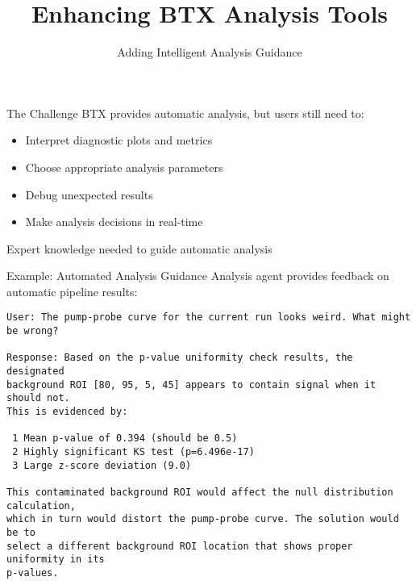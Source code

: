 \documentclass{beamer}
\title{Enhancing BTX Analysis Tools}
\subtitle{Adding Intelligent Analysis Guidance}
\author{}
\date{}
\begin{document}
\begin{frame}
    \titlepage
\end{frame}

\begin{frame}{The Challenge}
    BTX provides automatic analysis, but users still need to:
    \begin{itemize}
        \item Interpret diagnostic plots and metrics
        \item Choose appropriate analysis parameters
        \item Debug unexpected results
        \item Make analysis decisions in real-time
    \end{itemize}
    \vspace{0.3cm}
    Expert knowledge needed to guide automatic analysis
\end{frame}

\begin{frame}[fragile]{Example: Automated Analysis Guidance}
    Analysis agent provides feedback on automatic pipeline results:
    
    \vspace{0.3cm}
    \begin{Verbatim}[fontsize=\tiny,frame=single,baselinestretch=0.8]
User: The pump-probe curve for the current run looks weird. What might be wrong?

Response: Based on the p-value uniformity check results, the designated 
background ROI [80, 95, 5, 45] appears to contain signal when it should not. 
This is evidenced by:

 1 Mean p-value of 0.394 (should be 0.5)
 2 Highly significant KS test (p=6.496e-17)
 3 Large z-score deviation (9.0)

This contaminated background ROI would affect the null distribution calculation, 
which in turn would distort the pump-probe curve. The solution would be to 
select a different background ROI location that shows proper uniformity in its 
p-values.
    \end{Verbatim}
\end{frame}
\end{document}

